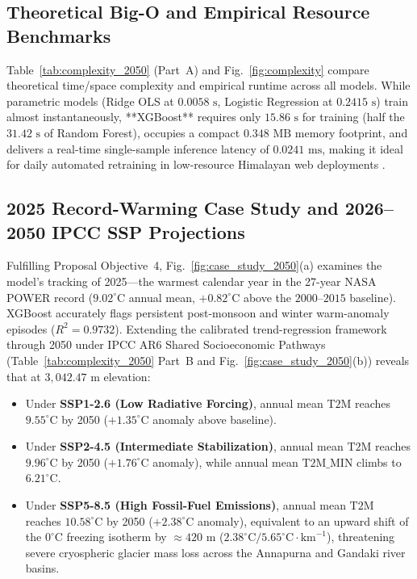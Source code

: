 \documentclass[conference]{IEEEtran}
\begin{document}
\subsection{Theoretical Big-O and Empirical Resource Benchmarks}
Table~\ref{tab:complexity_2050} (Part~A) and Fig.~\ref{fig:complexity} compare theoretical time/space complexity and empirical runtime across all models. While parametric models (Ridge OLS at $0.0058\text{ s}$, Logistic Regression at $0.2415\text{ s}$) train almost instantaneously, **XGBoost** requires only $15.86\text{ s}$ for training (half the $31.42\text{ s}$ of Random Forest), occupies a compact $0.348\text{ MB}$ memory footprint, and delivers a real-time single-sample inference latency of $0.0241\text{ ms}$, making it ideal for daily automated retraining in low-resource Himalayan web deployments \cite{nepal2025}.

\subsection{2025 Record-Warming Case Study and 2026--2050 IPCC SSP Projections}
Fulfilling Proposal Objective~4, Fig.~\ref{fig:case_study_2050}(a) examines the model's tracking of 2025---the warmest calendar year in the 27-year NASA POWER record ($9.02^\circ\text{C}$ annual mean, $+0.82^\circ\text{C}$ above the $2000\text{--}2015$ baseline). XGBoost accurately flags persistent post-monsoon and winter warm-anomaly episodes ($R^2 = 0.9732$). Extending the calibrated trend-regression framework through 2050 under IPCC AR6 Shared Socioeconomic Pathways (Table~\ref{tab:complexity_2050} Part~B and Fig.~\ref{fig:case_study_2050}(b)) reveals that at $3,042.47\text{ m}$ elevation:
\begin{itemize}
    \item Under \textbf{SSP1-2.6 (Low Radiative Forcing)}, annual mean $\text{T2M}$ reaches $9.55^\circ\text{C}$ by 2050 ($+1.35^\circ\text{C}$ anomaly above baseline).
    \item Under \textbf{SSP2-4.5 (Intermediate Stabilization)}, annual mean $\text{T2M}$ reaches $9.96^\circ\text{C}$ by 2050 ($+1.76^\circ\text{C}$ anomaly), while annual mean $\text{T2M\_MIN}$ climbs to $6.21^\circ\text{C}$.
    \item Under \textbf{SSP5-8.5 (High Fossil-Fuel Emissions)}, annual mean $\text{T2M}$ reaches $10.58^\circ\text{C}$ by 2050 ($+2.38^\circ\text{C}$ anomaly), equivalent to an upward shift of the $0^\circ\text{C}$ freezing isotherm by $\approx 420\text{ m}$ ($2.38^\circ\text{C} / 5.65^\circ\text{C}\cdot\text{km}^{-1}$), threatening severe cryospheric glacier mass loss across the Annapurna and Gandaki river basins.
\end{itemize}
\end{document}
